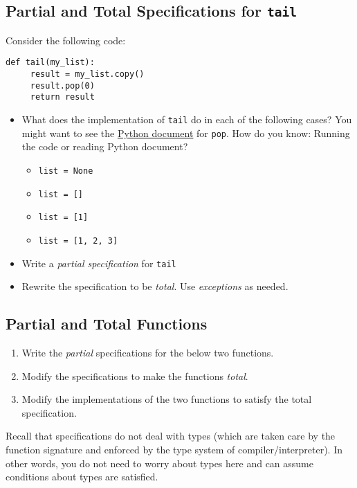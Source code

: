 \documentclass[oneside,11pt,dvipsnames]{book}
\newcommand{\code}[1]{\texttt{#1}}
\begin{document}
\subsection{Partial and Total Specifications for \code{tail}}\label{exercise:tail}

Consider the following code:

\begin{lstlisting}
def tail(my_list):
     result = my_list.copy()
     result.pop(0)
     return result
\end{lstlisting}

\begin{itemize}
     \item What does the implementation of \code{tail} do in each of the following cases? You might want to see the \href{https://docs.python.org/3/tutorial/datastructures.html}{Python document} for \code{pop}.  How do you know: Running the code or reading Python document?
     \begin{itemize}
         \item \code{list = None}
         \item \code{list = []}
         \item \code{list = [1]}  
         \item \code{list = [1, 2, 3]}
     \end{itemize}
     \item Write a \emph{partial specification} for \code{tail}
     \item Rewrite the specification to be \emph{total}. Use \emph{exceptions} as needed.
    \end{itemize}

\subsection{Partial and Total Functions}\label{exercise:partial-total}

\begin{enumerate}
    \item Write the \emph{partial} specifications for the below two functions.
    \item Modify the specifications to make the functions \emph{total}.
    \item Modify the implementations of the two functions to satisfy the total specification.
\end{enumerate}

Recall that specifications do not deal with types (which are taken care by the function signature and enforced by the type system of compiler/interpreter).  In other words, you do not need to worry about types here and can assume conditions about types are satisfied.
\end{document}
